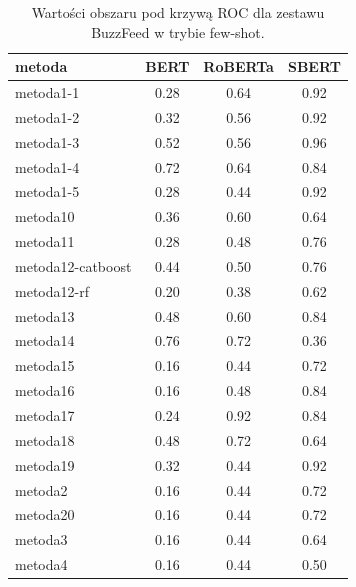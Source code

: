 \begin{table}[H]
	\centering
	\caption{Wartości obszaru pod krzywą ROC dla zestawu BuzzFeed w trybie few-shot.}
	\label{tab:roc_auc_few_shot_buzzfeed}
	\small
	\begin{tabular}{lccc}
		\toprule
		\textbf{metoda}   & \textbf{BERT} & \textbf{RoBERTa} & \textbf{SBERT} \\
		\midrule
		metoda1-1         & 0.28          & 0.64             & 0.92           \\
		metoda1-2         & 0.32          & 0.56             & 0.92           \\
		metoda1-3         & 0.52          & 0.56             & 0.96           \\
		metoda1-4         & 0.72          & 0.64             & 0.84           \\
		metoda1-5         & 0.28          & 0.44             & 0.92           \\
		metoda10          & 0.36          & 0.60             & 0.64           \\
		metoda11          & 0.28          & 0.48             & 0.76           \\
		metoda12-catboost & 0.44          & 0.50             & 0.76           \\
		metoda12-rf       & 0.20          & 0.38             & 0.62           \\
		metoda13          & 0.48          & 0.60             & 0.84           \\
		metoda14          & 0.76          & 0.72             & 0.36           \\
		metoda15          & 0.16          & 0.44             & 0.72           \\
		metoda16          & 0.16          & 0.48             & 0.84           \\
		metoda17          & 0.24          & 0.92             & 0.84           \\
		metoda18          & 0.48          & 0.72             & 0.64           \\
		metoda19          & 0.32          & 0.44             & 0.92           \\
		metoda2           & 0.16          & 0.44             & 0.72           \\
		metoda20          & 0.16          & 0.44             & 0.72           \\
		metoda3           & 0.16          & 0.44             & 0.64           \\
		metoda4           & 0.16          & 0.44             & 0.50           \\

\end{tabular}
\end{table}
